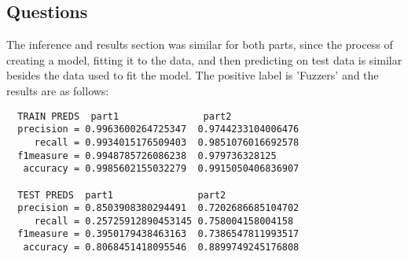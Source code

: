 \documentclass[11pt]{article}
\begin{document}
\subsection*{Questions}
The inference and results section was similar for both parts, since the process of creating a model, fitting it to the data, and then predicting on test data is
similar besides the data used to fit the model. The positive label is 'Fuzzers' and the results are as follows:
\begin{verbatim}
  TRAIN PREDS  part1               part2
  precision = 0.9963600264725347  0.9744233104006476
     recall = 0.9934015176509403  0.9851076016692578
  f1measure = 0.9948785726086238  0.979736328125
   accuracy = 0.9985602155032279  0.9915050406836907

  TEST PREDS  part1               part2
  precision = 0.8503908380294491  0.7202686685104702
     recall = 0.25725912890453145 0.758004158004158
  f1measure = 0.3950179438463163  0.7386547811993517
   accuracy = 0.8068451418095546  0.8899749245176808
\end{verbatim}
\end{document}
